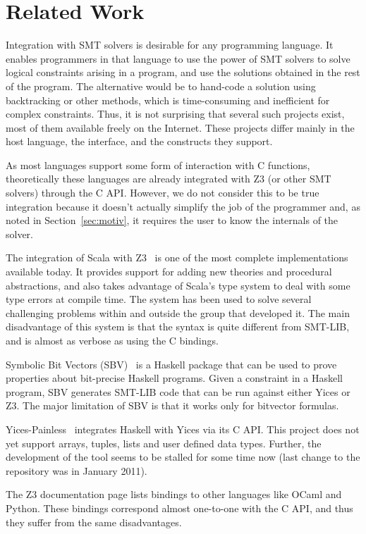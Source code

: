 \section{Related Work}
Integration with SMT solvers is desirable for any programming
language. It enables programmers in that language to use the
power of SMT solvers to solve logical constraints arising in
a program, and use the solutions obtained in the rest of the
program. The alternative would be to hand-code a solution
using backtracking or other methods, which is time-consuming and
inefficient for complex constraints. Thus, it is not
surprising that several such projects exist, most of them
available freely on the Internet. These projects differ
mainly in the host language, the interface, and
the constructs they support.

As most languages support some
form of interaction with C functions, theoretically these
languages are already integrated with Z3 (or other SMT
solvers) through the C API. However, we do not consider
this to be true integration because it doesn't actually simplify the job
of the programmer and, as noted in Section~\ref{sec:motiv}, it
requires the user to know the internals of the solver.

The integration of Scala with Z3~\cite{scalaz3} is one of the
most complete implementations available today. It provides support for adding
new theories and procedural abstractions, and also takes advantage
of Scala's
type system to deal with some type errors at compile time.
The system has been used to solve several challenging problems
within and outside the group that developed it. The main
disadvantage of this system is that the syntax is quite different from
SMT-LIB, and is almost as verbose as using the C bindings.

Symbolic Bit Vectors (SBV)~\cite{sbv} is a Haskell package that can
be used to prove properties about
bit-precise Haskell programs. Given a constraint in a Haskell
program, SBV generates SMT-LIB code that can be run against
either Yices or Z3.  The major limitation of SBV is that it
works only for bitvector formulas.

Yices-Painless~\cite{yices-painless} integrates Haskell with Yices
via its C API. This project
does not yet support arrays, tuples, lists and user defined
data types. Further, the development of the tool seems to
be stalled for some time now (last change to the repository
was in January 2011).

The Z3 documentation page lists bindings
to other languages like OCaml and Python. These bindings correspond
almost one-to-one with the C API, and thus they suffer from the same
disadvantages.
